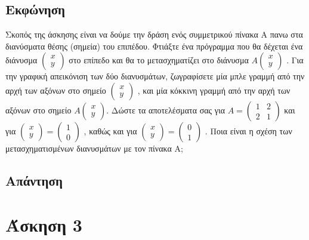 \documentclass[a4paper,12pt]{article}
\begin{document}
\subsection{Εκφώνηση}
Σκοπός της άσκησης είναι να δούμε την δράση ενός συμμετρικού πίνακα A πανω στα διανύσματα θέσης (σημεία)
του επιπέδου. Φτιάξτε ένα πρόγραμμα που θα δέχεται ένα διάνυσμα
$
    \begin{pmatrix}
        x \\
        y
    \end{pmatrix}
$
στο επίπεδο και θα το μετασχηματίζει στο διάνυσμα
$
    A
    \begin{pmatrix}
        x \\
        y
    \end{pmatrix}
$
. Για την γραφική απεικόνιση των δύο διανυσμάτων, ζωγραφίσετε μία μπλε γραμμή από την αρχή των αξόνων
στο σημείο
$
    \begin{pmatrix}
        x \\
        y
    \end{pmatrix}
$
, και μία κόκκινη γραμμή από την αρχή των αξόνων στο σημείο
$
    A
    \begin{pmatrix}
        x \\
        y
    \end{pmatrix}
$. Δώστε τα αποτελέσματα σας για
$
    A=\begin{pmatrix}
        1 & 2 \\
        2 & 1
    \end{pmatrix}
$
και για
$
    \begin{pmatrix}
        x \\
        y
    \end{pmatrix}=\begin{pmatrix}
        1 \\
        0
    \end{pmatrix}
$
, καθώς και για
$
    \begin{pmatrix}
        x \\
        y
    \end{pmatrix}=\begin{pmatrix}
        0 \\
        1
    \end{pmatrix}
$
. Ποια είναι η σχέση των μετασχηματισμένων διανυσμάτων με τον πίνακα Α;
\subsection{Απάντηση}
\newpage\section{Άσκηση 3}
\end{document}
